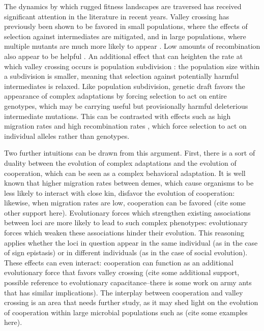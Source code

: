 \documentclass[rmp]{revtex4}
\begin{document}
The dynamics by which rugged fitness landscapes are traversed has received significant attention in the literature in recent years.
Valley crossing has previously been shown to be favored in small populations, where the effects of selection against intermediates are mitigated, and in large populations, where multiple mutants are much more likely to appear \citep{weissman_2009, ochs_2015}.
Low amounts of recombination also appear to be helpful \citep{weissman_2010}.
An additional effect that can heighten the rate at which valley crossing occurs is population subdivision \citep{Bitbol:Schwab:2014}: the population size within a subdivision is smaller, meaning that selection against potentially harmful intermediates is relaxed.
Like population subdivision, genetic draft favors the appearance of complex adaptations by forcing selection to act on entire genotypes, which may be carrying useful but provisionally harmful deleterious intermediate mutations.
This can be contrasted with effects such as high migration rates and high recombination rates \citep{neher_shraiman_2009}, which force selection to act on individual alleles rather than genotypes.

Two further intuitions can be drawn from this argument.
First, there is a sort of duality between the evolution of complex adaptations and the evolution of cooperation, which can be seen as a complex behavioral adaptation.
It is well known that higher migration rates between demes, which cause organisms to be less likely to interact with close kin, disfavor the evolution of cooperation: likewise, when migration rates are low, cooperation can be favored \citep{van_cleve_2015} (cite some other support here).
Evolutionary forces which strengthen existing associations between loci are more likely to lead to such complex phenotypes: evolutionary forces which weaken these associations hinder their evolution.
This reasoning applies whether the loci in question appear in the same individual (as in the case of sign epistasis) or in different individuals (as in the case of social evolution).
These effects can even interact: cooperation can function as an additional evolutionary force that favors valley crossing \citep{Obolski:Lewin-Epstein:2017} (cite some additional support, possible reference to evolutionary capacitance--there is some work on army ants that has similar implications).
The interplay between cooperation and valley crossing is an area that needs further study, as it may shed light on the evolution of cooperation within large microbial populations such as (cite some examples here).
\end{document}
